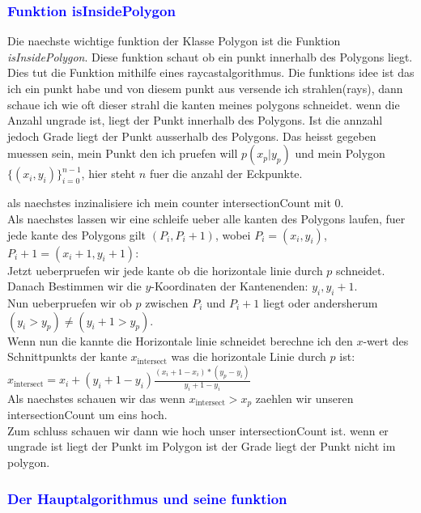 \documentclass{article}
\begin{document}
\subsubsection{\textcolor{blue}{Funktion isInsidePolygon}}
\begin{center}
Die naechste wichtige funktion der Klasse Polygon ist die Funktion \textit{isInsidePolygon}. Diese funktion schaut ob ein punkt innerhalb des Polygons liegt. Dies tut die Funktion mithilfe eines raycastalgorithmus. Die funktions idee ist das ich ein punkt habe und von diesem punkt aus versende ich strahlen(rays), dann schaue ich wie oft dieser strahl die kanten meines polygons schneidet. wenn die Anzahl ungrade ist, liegt der Punkt innerhalb des Polygons. Ist die annzahl jedoch Grade liegt der Punkt ausserhalb des Polygons. Das heisst gegeben muessen sein, mein Punkt den ich pruefen will $p(x_p|y_p)$ und mein Polygon \( \{ (x_i, y_i) \}_{i=0}^{n-1} \), hier steht $n$ fuer die anzahl der Eckpunkte.
\par\medskip
als naechstes inzinalisiere ich mein counter intersectionCount mit 0.
\\
Als naechstes lassen wir eine schleife ueber alle kanten des Polygons laufen, fuer jede kante des Polygons gilt $(P_i,P_i+1)$, wobei $P_i = (x_i,y_i)$, $P_i+1 = (x_i+1, y_i+1)$: 
\\
Jetzt ueberpruefen wir jede kante ob die horizontale linie durch $p$ schneidet.
\\
Danach Bestimmen wir die $y$-Koordinaten der Kantenenden: $y_i, y_i+1$.
\\
Nun ueberpruefen wir ob $p$ zwischen $P_i$ und $P_i+1$ liegt oder andersherum $(y_i > y_p) \neq (y_i+1 > y_p)$.
\\
Wenn nun die kannte die Horizontale linie schneidet berechne ich den $x$-wert des Schnittpunkts der kante $x_\text{intersect}$ was die horizontale Linie durch $p$ ist:
\\
$x_\text{intersect} = x_i + (y_i+1 - y_i)\frac{(x_i+1 - x_i) * (y_p - y_i)}{y_i+1 - y_i}$
\\
Als naechstes schauen wir das wenn $x_\text{intersect} > x_p$ zaehlen wir unseren intersectionCount um eins hoch.
\\
Zum schluss schauen wir dann wie hoch unser intersectionCount ist.  wenn er ungrade ist liegt der Punkt im Polygon ist der Grade liegt der Punkt nicht im polygon.
\end{center}
\subsubsection{\textcolor{blue}{Der Hauptalgorithmus und seine funktion}}
\end{document}
